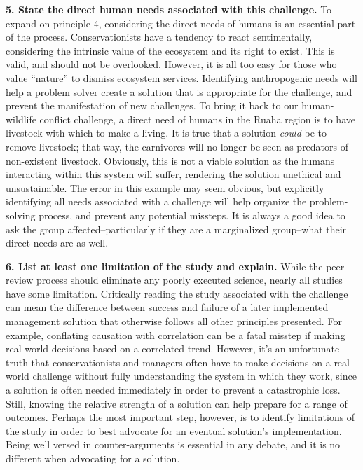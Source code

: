 \documentclass[10pt,letterpaper]{article}
\begin{document}
\textbf{5. State the direct human needs associated with this challenge.}
To expand on principle 4, considering the direct needs of humans is an
essential part of the process. Conservationists have a tendency to react
sentimentally, considering the intrinsic value of the ecosystem and its
right to exist. This is valid, and should not be overlooked. However, it
is all too easy for those who value ``nature'' to dismiss ecosystem
services. Identifying anthropogenic needs will help a problem solver
create a solution that is appropriate for the challenge, and prevent the
manifestation of new challenges. To bring it back to our human-wildlife
conflict challenge, a direct need of humans in the Ruaha region is to
have livestock with which to make a living. It is true that a solution
\emph{could} be to remove livestock; that way, the carnivores will no
longer be seen as predators of non-existent livestock. Obviously, this
is not a viable solution as the humans interacting within this system
will suffer, rendering the solution unethical and unsustainable. The
error in this example may seem obvious, but explicitly identifying all
needs associated with a challenge will help organize the problem-solving
process, and prevent any potential missteps. It is always a good idea to
ask the group affected--particularly if they are a marginalized
group--what their direct needs are as well.

\textbf{6. List at least one limitation of the study and explain.} While
the peer review process should eliminate any poorly executed science,
nearly all studies have some limitation. Critically reading the study
associated with the challenge can mean the difference between success
and failure of a later implemented management solution that otherwise
follows all other principles presented. For example, conflating
causation with correlation can be a fatal misstep if making real-world
decisions based on a correlated trend. However, it's an unfortunate
truth that conservationists and managers often have to make decisions on
a real-world challenge without fully understanding the system in which
they work, since a solution is often needed immediately in order to
prevent a catastrophic loss. Still, knowing the relative strength of a
solution can help prepare for a range of outcomes. Perhaps the most
important step, however, is to identify limitations of the study in
order to best advocate for an eventual solution's implementation. Being
well versed in counter-arguments is essential in any debate, and it is
no different when advocating for a solution.
\end{document}
